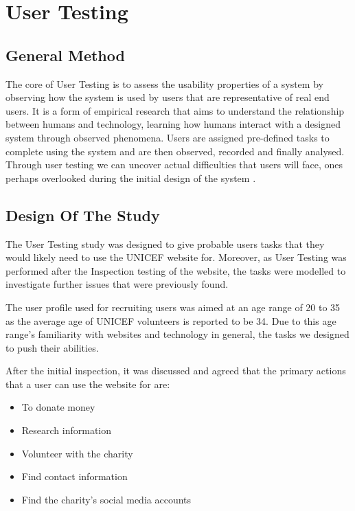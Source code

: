 \section*{User Testing}

\subsection{General Method}
The core of User Testing is to assess the usability properties of a system by observing how the system is used by users that are representative of real end users. It is a form of empirical research that aims to understand the relationship between humans and technology, learning how humans interact with a designed system through observed phenomena. 
Users are assigned pre-defined tasks to complete using the system and are then observed, recorded and finally analysed. 
Through user testing we can uncover actual difficulties that users will face, ones perhaps overlooked during the initial design of the system .

\subsection{Design Of The Study}
The User Testing study was designed to give probable users tasks that they would likely need to use the UNICEF website for. Moreover, as User Testing was performed after the Inspection testing of the website, the tasks were modelled to investigate further issues that were previously found. 

The user profile used for recruiting users was aimed at an age range of 20 to 35 as the average age of UNICEF volunteers is reported to be 34. Due to this age range’s familiarity with websites and technology in general, the tasks we designed to push their abilities.

After the initial inspection, it was discussed and agreed that the primary actions that a user can use the website for are:
\begin{itemize}
    \item To donate money 
    \item Research information
    \item Volunteer with the charity
    \item Find contact information
    \item Find the charity’s social media accounts
  \end{itemize}

